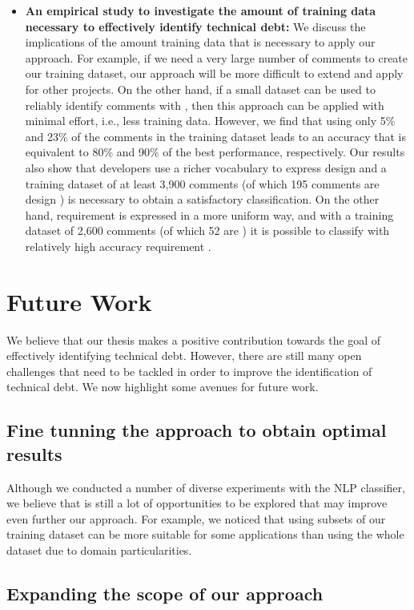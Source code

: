 \begin{itemize}
\item \textbf{An empirical study to investigate the amount of training data necessary to effectively identify technical debt:} We discuss the implications of the amount training data that is necessary to apply our approach. For example, if we need a very large number of comments to create our training dataset, our approach will be more difficult to extend and apply for other projects. On the other hand, if a small dataset can be used to reliably identify comments with \SATD, then this approach can be applied with minimal effort, i.e., less training data. However, we find that using only 5\% and 23\% of the comments in the training dataset leads to an accuracy that is equivalent to 80\% and 90\% of the best performance, respectively. Our results also show that developers use a richer vocabulary to express design \SATD and a training dataset of at least 3,900 comments (of which 195 comments are design \SATD) is necessary to obtain a satisfactory classification. On the other hand, requirement \SATD is expressed in a more uniform way, and with a training dataset of 2,600 comments (of which 52 are \SATD) it is possible to classify with relatively high accuracy requirement \SATD.

\end{itemize}

\section{Future Work}

We believe that our thesis makes a positive contribution towards the goal of effectively identifying technical debt. However, there are still many open challenges that need to be tackled in order to improve the identification of technical debt. We now highlight some avenues for future work.

\subsection{Fine tunning the approach to obtain optimal results}

Although we conducted a number of diverse experiments with the NLP classifier, we believe that is still a lot of opportunities to be explored that may improve even further our approach. For example, we noticed that using subsets of our training dataset can be more suitable for some applications than using the whole dataset due to domain particularities. 

\subsection{Expanding the scope of our approach}

